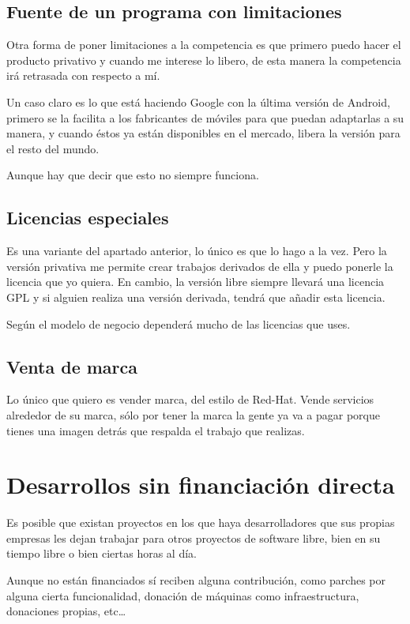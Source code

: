 \subsection{Fuente de un programa con limitaciones}

Otra forma de poner limitaciones a la competencia es que primero puedo hacer el
producto privativo y cuando me interese lo libero, de esta manera la competencia
irá retrasada con respecto a mí.

Un caso claro es lo que está haciendo Google con la última versión de Android,
primero se la facilita a los fabricantes de móviles para que puedan adaptarlas a
su manera, y cuando éstos ya están disponibles en el mercado, libera la versión
para el resto del mundo.

Aunque hay que decir que esto no siempre funciona.

\subsection{Licencias especiales}
Es una variante del apartado anterior, lo único es que lo hago a la vez.
Pero la versión privativa me permite crear trabajos
derivados de ella y puedo ponerle la licencia que yo quiera. En cambio, la
versión libre siempre llevará una licencia GPL y si alguien realiza una versión
derivada, tendrá que añadir esta licencia.

Según el modelo de negocio dependerá mucho de las licencias que uses.

\subsection{Venta de marca}
Lo único que quiero es vender marca, del estilo de Red-Hat. Vende servicios
alrededor de su marca, sólo por tener la marca la gente ya va a pagar porque
tienes una imagen detrás que respalda el trabajo que realizas.

\section{Desarrollos sin financiación directa}
Es posible que existan proyectos en los que haya desarrolladores que sus
propias empresas les dejan trabajar para otros proyectos de software libre, bien
en su tiempo libre o bien ciertas horas al día.

Aunque no están financiados sí reciben alguna contribución, como parches por
alguna cierta funcionalidad, donación de máquinas como infraestructura,
donaciones propias, etc\ldots


